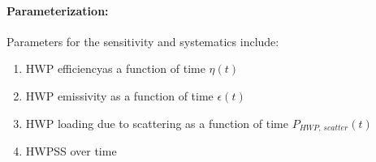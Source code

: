 \paragraph{Parameterization:}

Parameters for the sensitivity and systematics include:

\begin{enumerate}
	\item HWP efficiencyas a function of time $\eta(t)$
	\item HWP emissivity as a function of time $\epsilon(t)$
	\item HWP loading due to scattering as a function of time $P_{HWP, \, scatter}(t)$
	\item HWPSS over time
\end{enumerate}	
